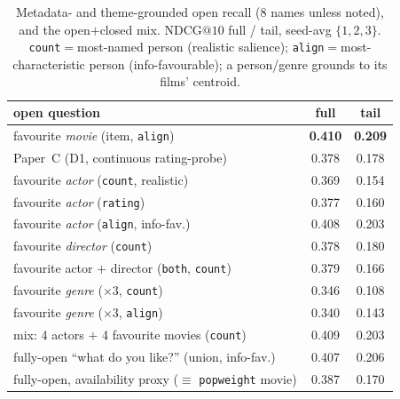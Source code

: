 \documentclass[11pt]{article}
\makeatletter
\newcommand{\ndcg}{\mathrm{NDCG@}10}
\makeatother
\begin{document}
\begin{table}[t]
\centering
\caption{Metadata- and theme-grounded open recall ($8$ names unless noted), and the open$+$closed mix. $\ndcg$ full /
tail, seed-avg $\{1,2,3\}$. \texttt{count}$=$most-named person (realistic salience); \texttt{align}$=$most-characteristic
person (info-favourable); a person/genre grounds to its films' centroid.}
\label{tab:metadata}
\begin{tabular}{lcc}
\toprule
open question & full & tail \\
\midrule
favourite \emph{movie} (item, \texttt{align}) & \textbf{0.410} & \textbf{0.209} \\
Paper~C (D1, continuous rating-probe) & 0.378 & 0.178 \\
\midrule
favourite \emph{actor} (\texttt{count}, realistic)   & 0.369 & 0.154 \\
favourite \emph{actor} (\texttt{rating})             & 0.377 & 0.160 \\
favourite \emph{actor} (\texttt{align}, info-fav.)   & 0.408 & 0.203 \\
favourite \emph{director} (\texttt{count})           & 0.378 & 0.180 \\
favourite actor $+$ director (\texttt{both}, \texttt{count}) & 0.379 & 0.166 \\
\midrule
favourite \emph{genre} ($\times 3$, \texttt{count})  & 0.346 & 0.108 \\
favourite \emph{genre} ($\times 3$, \texttt{align})  & 0.340 & 0.143 \\
\midrule
mix: 4 actors $+$ 4 favourite movies (\texttt{count}) & 0.409 & 0.203 \\
\midrule
fully-open ``what do you like?'' (union, info-fav.) & 0.407 & 0.206 \\
fully-open, availability proxy ($\equiv$ \texttt{popweight} movie) & 0.387 & 0.170 \\
\bottomrule
\end{tabular}
\end{table}
\end{document}
